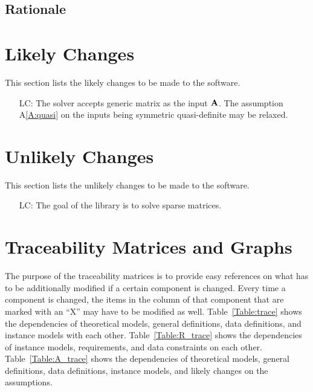 \documentclass[12pt]{article}
\newcommand{\aref}[1]{A\ref{#1}}
\newcounter{lcnum} %
\begin{document}
\subsection{Rationale}


\section{Likely Changes}

This section lists the likely changes to be made to the software.

\begin{itemize}
\item[LC\refstepcounter{lcnum}\thelcnum\label{LC:generic}:] The solver accepts
  generic matrix as the input \(\mathbf{A}\). The assumption \aref{A:quasi} on the
  inputs being symmetric quasi-definite may be relaxed.
\end{itemize}

\section{Unlikely Changes}

This section lists the unlikely changes to be made to the software.

\begin{itemize}
\item[LC\refstepcounter{lcnum}\thelcnum\label{LC:sparse}:] The goal of the library is
  to solve sparse matrices.
\end{itemize}

\section{Traceability Matrices and Graphs}

The purpose of the traceability matrices is to provide easy references on what
has to be additionally modified if a certain component is changed.  Every time a
component is changed, the items in the column of that component that are marked
with an ``X'' may have to be modified as well.  Table~\ref{Table:trace} shows the
dependencies of theoretical models, general definitions, data definitions, and
instance models with each other. Table~\ref{Table:R_trace} shows the
dependencies of instance models, requirements, and data constraints on each
other. Table~\ref{Table:A_trace} shows the dependencies of theoretical models,
general definitions, data definitions, instance models, and likely changes on
the assumptions.
\end{document}
